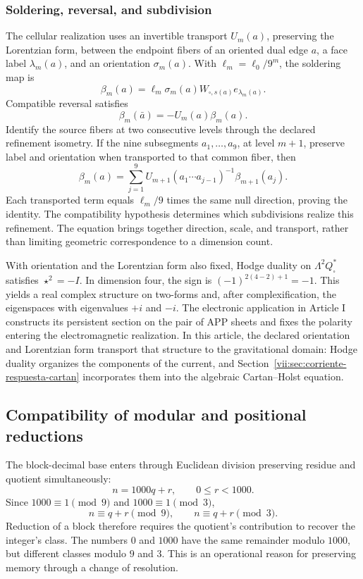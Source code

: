 \subsubsection{Soldering, reversal, and subdivision}

The cellular realization uses an invertible transport \(U_m(a)\),
preserving the Lorentzian form, between the endpoint fibers of an
oriented dual edge \(a\), a face label \(\lambda_m(a)\),
and an orientation \(\sigma_m(a)\).
With \(\ell_m=\ell_0/9^m\), the soldering map is
\[
 \beta_m(a)=\ell_m\sigma_m(a)
 W_{\square,s(a)}e_{\lambda_m(a)}.
\]
Compatible reversal satisfies
\[
 \beta_m(\bar a)=-U_m(a)\beta_m(a).
\]
Identify the source fibers at two consecutive levels through the declared
refinement isometry. If the nine subsegments \(a_1,\ldots,a_9\),
at level \(m+1\), preserve label and orientation when transported
to that common fiber, then
\begin{equation}
 \beta_m(a)=\sum_{j=1}^9
 U_{m+1}(a_1\cdots a_{j-1})^{-1}\beta_{m+1}(a_j).
 \label{eq:soldadura-refinamiento}
\end{equation}
Each transported term equals \(\ell_m/9\) times the same null
direction, proving the identity. The compatibility hypothesis determines
which subdivisions realize this refinement. The equation brings together
direction, scale, and transport, rather than limiting geometric
correspondence to a dimension count.

With orientation and the Lorentzian form also fixed, Hodge duality
on \(\Lambda^2Q_\square^*\) satisfies \(\star^2=-I\).
In dimension four, the sign is \((-1)^{2(4-2)+1}=-1\).
This yields a real complex structure on two-forms and, after
complexification, the eigenspaces with eigenvalues \(+i\) and \(-i\).
The electronic application in Article I constructs its persistent section
on the pair of APP sheets and fixes the polarity entering the
electromagnetic realization. In this article, the declared orientation and
Lorentzian form transport that structure to the gravitational domain:
Hodge duality organizes the components of the current, and
Section~\ref{vii:sec:corriente-respuesta-cartan} incorporates them into the
algebraic Cartan--Holst equation.

\subsection{Compatibility of modular and positional reductions}

The block-decimal base enters through Euclidean division preserving
residue and quotient simultaneously:
\[
 n=1000q+r,\qquad 0\le r<1000.
\]
Since \(1000\equiv1\pmod9\) and \(1000\equiv1\pmod3\),
\[
 n\equiv q+r\pmod9,\qquad n\equiv q+r\pmod3.
\]
Reduction of a block therefore requires the quotient's contribution
to recover the integer's class. The numbers \(0\) and \(1000\)
have the same remainder modulo \(1000\), but different classes
modulo \(9\) and \(3\). This is an operational reason for preserving
memory through a change of resolution.

